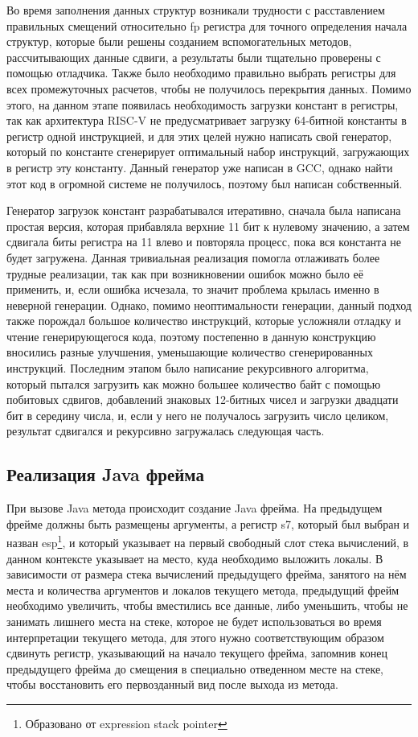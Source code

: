  
Во время заполнения данных структур возникали трудности с расставлением правильных смещений относительно fp регистра для точного определения начала структур, которые были решены созданием вспомогательных методов, рассчитывающих данные сдвиги, а результаты были тщательно проверены с помощью отладчика. Также было необходимо правильно выбрать регистры для всех промежуточных расчетов, чтобы не получилось перекрытия данных. Помимо этого, на данном этапе появилась необходимость загрузки констант в регистры, так как архитектура RISC-V не предусматривает загрузку 64-битной константы в регистр одной инструкцией, и для этих целей нужно написать свой генератор, который по константе сгенерирует оптимальный набор инструкций, загружающих в регистр эту константу. Данный генератор уже написан в GCC, однако найти этот код в огромной системе не получилось, поэтому был написан собственный.

Генератор загрузок констант разрабатывался итеративно, сначала была написана простая версия, которая прибавляла верхние 11 бит к нулевому значению, а затем сдвигала биты регистра на 11 влево и повторяла процесс, пока вся константа не будет загружена. Данная тривиальная реализация помогла отлаживать более трудные реализации, так как при возникновении ошибок можно было её применить, и, если ошибка исчезала, то значит проблема крылась именно в неверной генерации. Однако, помимо неоптимальности генерации, данный подход также порождал большое количество инструкций, которые усложняли отладку и чтение генерирующегося кода, поэтому постепенно в данную конструкцию вносились разные улучшения, уменьшающие количество сгенерированных инструкций. Последним этапом было написание рекурсивного алгоритма, который пытался загрузить как можно большее количество байт с помощью побитовых сдвигов, добавлений знаковых 12-битных чисел и загрузки двадцати бит в середину числа, и, если у него не получалось загрузить число целиком, результат сдвигался и рекурсивно загружалась следующая часть. 



\subsection{Реализация Java фрейма}
При вызове Java метода происходит создание Java фрейма. На предыдущем фрейме должны быть размещены аргументы, а регистр s7, который был выбран и назван esp\footnote{Образовано от expression stack pointer}, и который указывает на первый свободный слот стека вычислений, в данном контексте указывает на место, куда необходимо выложить локалы. В зависимости от размера стека вычислений предыдущего фрейма, занятого на нём места и количества аргументов и локалов текущего метода, предыдущий фрейм необходимо увеличить, чтобы вместились все данные, либо уменьшить, чтобы не занимать лишнего места на стеке, которое не будет использоваться во время интерпретации текущего метода, для этого нужно соответствующим образом сдвинуть регистр, указывающий на начало текущего фрейма, запомнив конец предыдущего фрейма до смещения в специально отведенном месте на стеке, чтобы восстановить его первозданный вид после выхода из метода.

